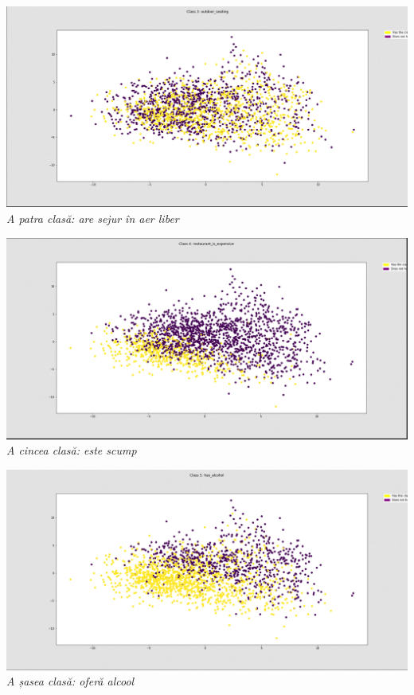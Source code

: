 \begin{center}
\includegraphics[scale=0.4]{class3} \\
\textit{A patra clasă: are sejur în aer liber} \\
\hfill \break

\includegraphics[scale=0.4]{class4} \\
\textit{A cincea clasă: este scump} \\
\hfill \break

\includegraphics[scale=0.4]{class5} \\
\textit{A șasea clasă: oferă alcool} \\
\hfill \break


\end{center}

